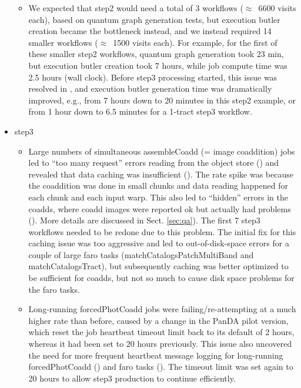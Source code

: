 \begin{itemize}
\begin{itemize}
 \item
 We expected that step2 would need a total of 3 workflows ($\approx$~6600 visits each), based on quantum graph generation tests, but execution butler creation became the bottleneck instead, and we instead required 14 smaller workflows ($\approx$~1500 visits each).
 For example, for the first of these smaller step2 workflows, quantum graph generation took 23 min, but execution butler creation took 7 hours, while job compute time was 2.5 hours (wall clock).
 Before step3 processing started, this issue was resolved in , and execution butler generation time was dramatically improved, e.g., from 7 hours down to 20 minutes in this step2 example, or from 1 hour down to 6.5 minutes for a 1-tract step3 workflow.

\end{itemize} %

\item step3
\begin{itemize}

  \item
  Large numbers of simultaneous assembleCoadd (= image coaddition) jobs led to ``too many request'' errors reading from the object store () and revealed that data caching was insufficient ().
  The rate spike was because the coaddition was done in small chunks and data reading happened for each chunk and each input warp.
  This also led to ``hidden'' errors in the coadds, where coadd images were reported ok but actually had problems ().
  More details are discussed in Sect. \ref{sec:qa}).
  The first 7 step3 workflows needed to be redone due to this problem.
  The initial fix for this caching issue was too aggressive and led to out-of-disk-space errors for a couple of large faro tasks (matchCatalogsPatchMultiBand and matchCatalogsTract), but subsequently caching was better optimized to be sufficient for coadds, but not so much to cause disk space problems for the faro tasks.

  \item
  Long-running forcedPhotCoadd jobs were failing/re-attempting at a much higher rate than before, caused by a change in the PanDA pilot version, which reset the job heartbeat timeout limit back to its default of 2 hours, whereas it had been set to 20 hours previously.
  This issue also uncovered the need for more frequent heartbeat message logging for long-running forcedPhotCoadd () and faro tasks ().
  The timeout limit was set again to 20 hours to allow step3 production to continue efficiently.


\end{itemize}
\end{itemize}
